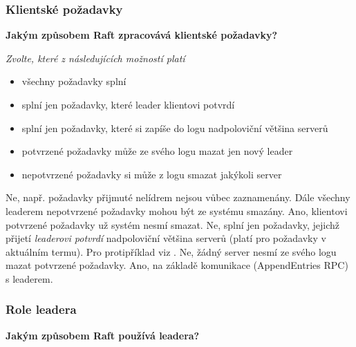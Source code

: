 \documentclass[usenames,dvipsnames,9pt]{beamer}
\begin{document}
{
\begin{frame}[fragile]
\frametitle{Klientské požadavky}

\begin{center}
{\bf Jakým způsobem Raft zpracovává klientské požadavky?}
\end{center}

\vspace{1em}

{\em Zvolte, které z následujících možností platí}

\begin{itemize}
\item všechny požadavky splní 
\item splní jen požadavky, které leader klientovi potvrdí 
\item splní jen požadavky, které si zapíše do logu nadpoloviční většina serverů 
\item potvrzené požadavky může ze svého logu mazat jen nový leader 
\item nepotvrzené požadavky si může z logu smazat jakýkoli server 
\end{itemize}
\vspace{1em}
\begin{overprint}[\textwidth]
   Ne, např. požadavky přijmuté nelídrem nejsou vůbec zaznamenány. Dále všechny leaderem nepotvrzené požadavky mohou být ze systému smazány.
   Ano, klientovi potvrzené požadavky už systém nesmí smazat.
   Ne, splní jen požadavky, jejichž přijetí \emph{leaderovi potvrdí} nadpoloviční většina serverů (platí pro požadavky v aktuálním termu). Pro protipříklad viz \href{https://www.cs.princeton.edu/courses/archive/fall16/cos418/papers/raft.pdf}{}.
   Ne, žádný server nesmí ze svého logu mazat potvrzené požadavky.
   Ano, na základě komunikace (AppendEntries RPC) s leaderem.
\end{overprint}
\end{frame}


\begin{frame}[fragile]
\frametitle{Role leadera}

\begin{center}
{\bf Jakým způsobem Raft používá leadera?}
\end{center}


\end{frame}}
\end{document}
